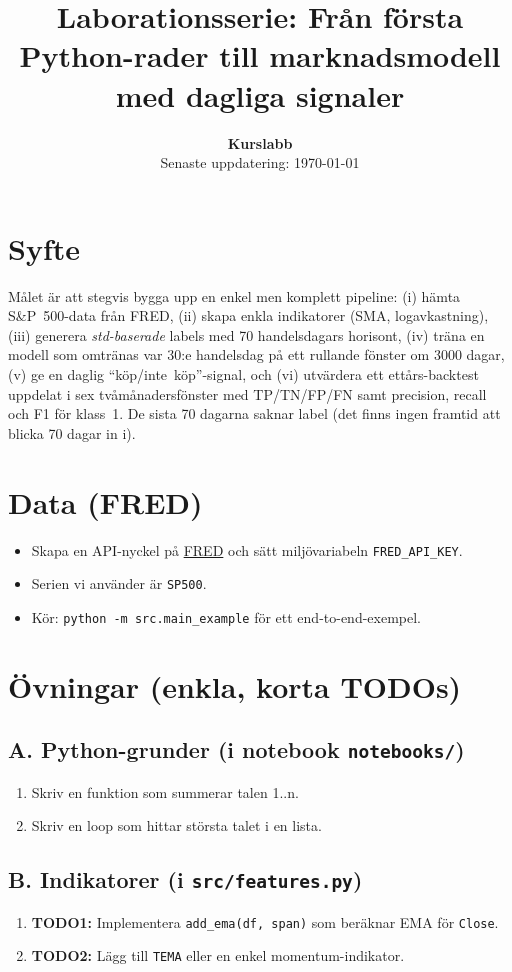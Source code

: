 \documentclass[11pt,a4paper]{scrartcl}
\title{Laborationsserie: Från första Python-rader till marknadsmodell med dagliga signaler}
\author{%
  \textbf{Kurslabb} \\[4pt]
  \small Senaste uppdatering: \today
}
\date{}
\begin{document}
\maketitle

\section*{Syfte}
Målet är att stegvis bygga upp en enkel men komplett pipeline:
(i) hämta S\&P~500-data från FRED, (ii) skapa enkla indikatorer (SMA, logavkastning),
(iii) generera \emph{std-baserade} labels med 70 handelsdagars horisont,
(iv) träna en modell som omtränas var 30:e handelsdag på ett rullande fönster om 3000 dagar,
(v) ge en daglig ``köp/inte~köp''-signal, och (vi) utvärdera ett ettårs-backtest uppdelat i sex tvåmånadersfönster
med TP/TN/FP/FN samt precision, recall och F1 för klass~1.
De sista 70 dagarna saknar label (det finns ingen framtid att blicka 70 dagar in i).

\section*{Data (FRED)}
\begin{itemize}
  \item Skapa en API-nyckel på \href{https://fred.stlouisfed.org/}{FRED} och sätt miljövariabeln \texttt{FRED\_API\_KEY}.
  \item Serien vi använder är \texttt{SP500}.
  \item Kör: \texttt{python -m src.main\_example} för ett end-to-end-exempel.
\end{itemize}

\section*{Övningar (enkla, korta TODOs)}
\subsection*{A. Python-grunder (i notebook \texttt{notebooks/})}
\begin{enumerate}
  \item Skriv en funktion som summerar talen 1..n.
  \item Skriv en loop som hittar största talet i en lista.
\end{enumerate}

\subsection*{B. Indikatorer (i \texttt{src/features.py})}
\begin{enumerate}
  \item \textbf{TODO1:} Implementera \texttt{add\_ema(df, span)} som beräknar EMA för \texttt{Close}.
  \item \textbf{TODO2:} Lägg till \texttt{TEMA} eller en enkel momentum-indikator.
\end{enumerate}
\end{document}
